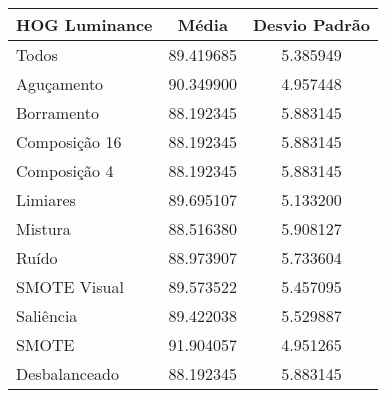 

\begin{table}[!htbp]
\centering
\caption{}
\label{tab:resultados:x:melhor}
\begin{tabular}{|l|c|c|}
\hline
\textbf{HOG Luminance} & \textbf{Média}     & \textbf{Desvio Padrão} \\ \hline
   Todos        &  89.419685 &  5.385949  \\ \hline
  Aguçamento    &  90.349900 &  4.957448  \\ \hline
  Borramento    &  88.192345 &  5.883145  \\ \hline
  Composição 16 &  88.192345 &  5.883145  \\ \hline
  Composição 4  &  88.192345 &  5.883145  \\ \hline
  Limiares      &  89.695107 &  5.133200  \\ \hline
  Mistura       &  88.516380 &  5.908127  \\ \hline
  Ruído         &  88.973907 &  5.733604  \\ \hline
  SMOTE Visual  &  89.573522 &  5.457095  \\ \hline
  Saliência     &  89.422038 &  5.529887  \\ \hline
 SMOTE          &  91.904057 &  4.951265  \\ \hline
Desbalanceado   &  88.192345 &  5.883145  \\ \hline
\end{tabular}
\end{table}

